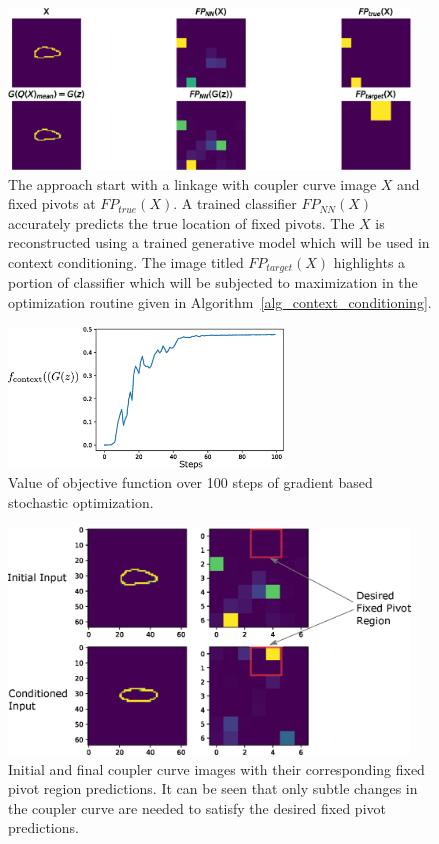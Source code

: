 \begin{figure}
\centering
\includegraphics[width=0.95\textwidth]{idetc-20/figure/fig_x_input_for_context_conditioning.eps}
  \caption{The approach start with a linkage with coupler curve image $X$ and fixed pivots at $FP_{true}(X)$. A trained classifier $FP_{NN}(X)$ accurately predicts the true location of fixed pivots. The $X$ is reconstructed using a trained generative model which will be used in context conditioning. The image titled $FP_{target}(X)$ highlights a portion of classifier which will be subjected to maximization in the optimization routine given in Algorithm~\ref{alg_context_conditioning}.}
\label{fig_x_input_for_context_conditioning}
\end{figure}


\begin{figure}
\centering
\includegraphics[width=0.65\textwidth]{idetc-20/figure/fig_context_optimization_graph.eps}
  \caption{Value of objective function over 100 steps of gradient based stochastic optimization.}
\label{fig_context_optimization_graph}
\end{figure}

\begin{figure}
\centering
\includegraphics[width=0.95\textwidth]{idetc-20/figure/fig_context_conditioning_result.eps}
  \caption{Initial and final coupler curve images with their corresponding fixed pivot region predictions. It can be seen that only subtle changes in the coupler curve are needed to satisfy the desired fixed pivot predictions.}
\label{fig_context_conditioning_result}
\end{figure}

